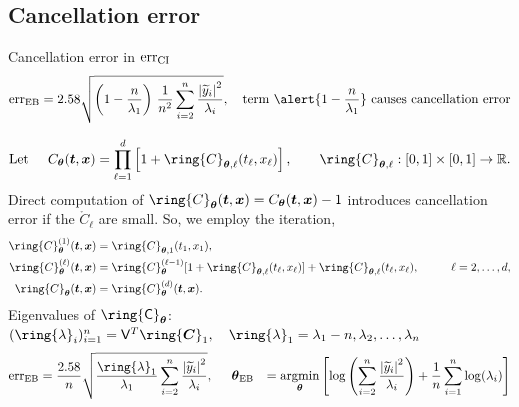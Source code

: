 \documentclass[handout, 10pt,compress,xcolor={usenames,dvipsnames}]{beamer} %
\newcommand{\bm}[1]{\boldsymbol{#1}}
\newcommand{\MLE}{\textup{EB}}
\newcommand{\CI}{\textup{CI}}
\newcommand{\vC}{\bvec{C}}
\newcommand{\rmC}{\ring{\mC}}
\newcommand{\err}{{\text{err}}}
\newcommand{\rlambda}{\ring{\lambda}}
\newcommand{\rC}{\ring{C}}
\newcommand{\rvC}{\ring{\vC}}
\renewcommand{\ty}{\widetilde{y}}
\renewcommand{\vtheta}{{\bm{\theta}}}
\newcommand{\pause}{}
\def\abs#1{\ensuremath{\left \lvert #1 \right \rvert}}
\begin{document}
\subsection{Cancellation error}

\begin{frame}{Cancellation error in $\err_\CI$}
	\vspace{-7.5ex}
	\begin{align*}
	\err_\MLE =
	2.58\sqrt{\left( 1 - \frac{n}{\lambda_1} \right) \,
		\frac {1}{n^2} \sum_{i=2}^{n} \frac{\abs{\ty_i}^2}{\lambda_i}  }
	,
	\quad \text{term $\alert{ 1 - \frac{n}{\lambda_1} }$ causes cancellation error}
	\end{align*}
	\pause
	\vspace{-2ex}
	\begin{align*}
	\text{Let} \hspace{0.5cm} C_{\vtheta}(\vt, \vx) = \prod_{\ell=1}^d \left[1 + \rC_{\vtheta,\ell}(t_\ell,x_\ell) \right], \qquad  \rC_{\vtheta,\ell}:[0,1] \times [0,1] \to \reals.
	\end{align*}
	Direct computation of $\rC_{\vtheta} (\vt,\vx) = C_{\vtheta}(\vt,\vx) -1$ introduces cancellation error if the $ \rC_\ell$ are small.  So, we employ the iteration,
	\begin{align*}
	\rC_{\vtheta}^{(1)}(\vt,\vx) &= \rC_{\vtheta,1}(t_1,x_1),  \\
	\rC_{\vtheta}^{(\ell)}(\vt,\vx) &  = \rC_{\vtheta}^{(\ell-1)}[1 + \rC_{\vtheta,\ell}(t_\ell,x_\ell)] + \rC_{\vtheta,\ell}(t_\ell,x_\ell),  \hspace{1cm} \ell = 2, \ldots, d, \\
	\rC_{\vtheta}(\vt,\vx)  & = \rC_{\vtheta}^{(d)}(\vt,\vx).
	\end{align*}
	Eigenvalues of $\rmC_{\vtheta}$:  
	$(\rlambda_i)_{i=1}^n = \mV^T \rvC_1, \quad \rlambda_1 = \lambda_1 - n, \lambda_2, \ldots, \lambda_n$
	\begin{align*}
	\err_\MLE  &
	=
	\frac{2.58}{n}\sqrt{
		\frac{\rlambda_1}{\lambda_1}
		\sum_{i=2}^{n} \frac{\abs{\ty_i}^2}{\lambda_i}  
	}, 
	\hspace{0.5cm}
	\vtheta_\MLE
	&= 
	\argmin_{\vtheta}
	\left[
	\log\left(
	\sum_{i=2}^n \frac{\abs{\ty_i}^2}{\lambda_i}
	\right) 
	+ 
	\frac{1}{n}\sum_{i=1}^n \log(\lambda_i)
	\right]
	\end{align*}
	
\end{frame}
\end{document}
